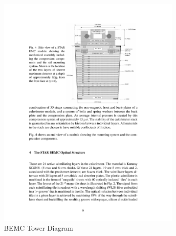 \begin{figure}[htbp]
	\begin{subfigure}{0.5\textwidth}
		\includegraphics[width=\textwidth]{Plots/Detector/BEMC_tower.pdf}
		\caption{BEMC Tower Diagram}
		\label{fig:BEMC_towera}
	\end{subfigure}
	\begin{subfigure}{0.5\textwidth}

\end{subfigure}
\end{figure}
